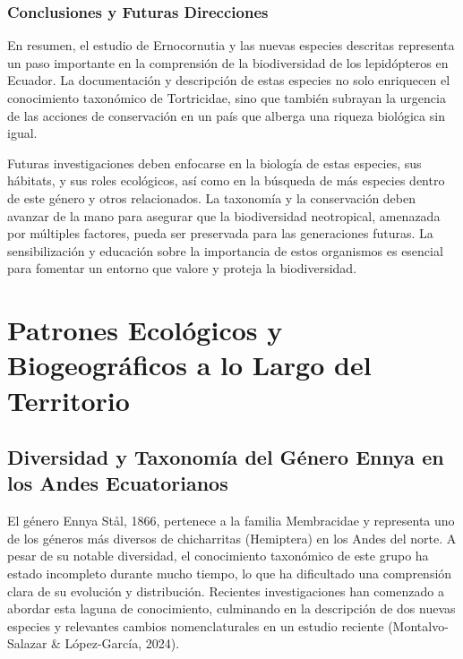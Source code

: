 \documentclass[
  letterpaper,
  DIV=11,
  numbers=noendperiod,
  oneside]{scrreprt}
\begin{document}
\subsection{Conclusiones y Futuras
Direcciones}\label{conclusiones-y-futuras-direcciones}

En resumen, el estudio de Ernocornutia y las nuevas especies descritas
representa un paso importante en la comprensión de la biodiversidad de
los lepidópteros en Ecuador. La documentación y descripción de estas
especies no solo enriquecen el conocimiento taxonómico de Tortricidae,
sino que también subrayan la urgencia de las acciones de conservación en
un país que alberga una riqueza biológica sin igual.

Futuras investigaciones deben enfocarse en la biología de estas
especies, sus hábitats, y sus roles ecológicos, así como en la búsqueda
de más especies dentro de este género y otros relacionados. La taxonomía
y la conservación deben avanzar de la mano para asegurar que la
biodiversidad neotropical, amenazada por múltiples factores, pueda ser
preservada para las generaciones futuras. La sensibilización y educación
sobre la importancia de estos organismos es esencial para fomentar un
entorno que valore y proteja la biodiversidad.

\chapter{Patrones Ecológicos y Biogeográficos a lo Largo del
Territorio}\label{patrones-ecoluxf3gicos-y-biogeogruxe1ficos-a-lo-largo-del-territorio}

\section{Diversidad y Taxonomía del Género Ennya en los Andes
Ecuatorianos}\label{diversidad-y-taxonomuxeda-del-guxe9nero-ennya-en-los-andes-ecuatorianos}

El género Ennya Stål, 1866, pertenece a la familia Membracidae y
representa uno de los géneros más diversos de chicharritas (Hemiptera)
en los Andes del norte. A pesar de su notable diversidad, el
conocimiento taxonómico de este grupo ha estado incompleto durante mucho
tiempo, lo que ha dificultado una comprensión clara de su evolución y
distribución. Recientes investigaciones han comenzado a abordar esta
laguna de conocimiento, culminando en la descripción de dos nuevas
especies y relevantes cambios nomenclaturales en un estudio reciente
(Montalvo-Salazar \& López-García, 2024).
\end{document}
